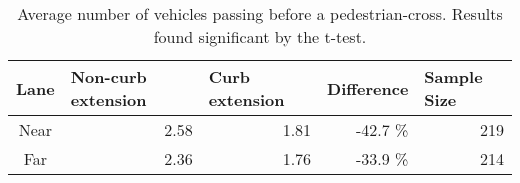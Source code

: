\begin{table}[!htbp]
\centering
\begin{tabular}{@{}crrrr@{}}
\toprule
\multicolumn{1}{l}{Lane} & \multicolumn{1}{l}{Non-curb extension} & \multicolumn{1}{l}{Curb extension} & \multicolumn{1}{l}{Difference} & \multicolumn{1}{l}{Sample Size} \\ \midrule
Near                     & 2.58                                   & 1.81                               & -42.7 \%                            & 219                             \\
Far                      & 2.36                                   & 1.76                               & -33.9  \%                           & 214                           \\
\bottomrule 
\end{tabular}
\caption{Average number of vehicles passing before a pedestrian-cross. Results found significant by the t-test.}\label{table:vehicles-passed}
\end{table}